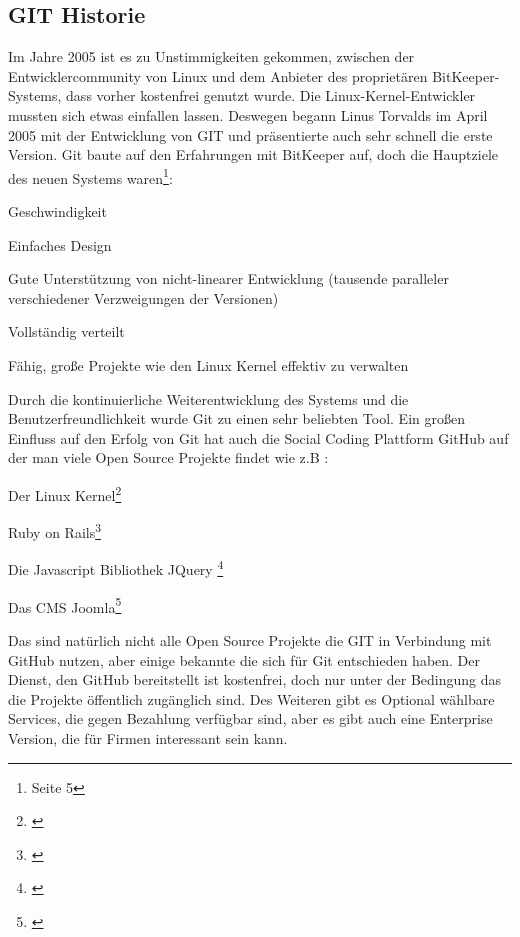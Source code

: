 \documentclass[12pt,a4paper,bibliography=totocnumbered,listof=totocnumbered]{scrartcl}
\begin{document}

\subsection{GIT Historie }
Im Jahre 2005 ist es zu Unstimmigkeiten gekommen, zwischen der Entwicklercommunity von Linux und dem Anbieter des proprietären BitKeeper-Systems, dass vorher kostenfrei genutzt wurde. Die Linux-Kernel-Entwickler mussten sich etwas einfallen lassen. Deswegen begann  Linus Torvalds im April 2005 mit der Entwicklung von GIT und präsentierte auch sehr schnell die erste Version. Git baute auf den Erfahrungen mit BitKeeper auf, doch die Hauptziele des neuen Systems waren\footnote{\cite{chacon2009pro} Seite 5}:

\begin{compactitem}
	\item Geschwindigkeit
	\item Einfaches Design
	\item Gute Unterstützung von nicht-linearer Entwicklung (tausende paralleler verschiedener Verzweigungen der Versionen)
	\item Vollständig verteilt
	\item Fähig, große Projekte wie den Linux Kernel effektiv zu verwalten
\end{compactitem}
Durch die kontinuierliche Weiterentwicklung des Systems und die Benutzerfreundlichkeit wurde Git zu einen sehr beliebten Tool.
Ein großen Einfluss auf den Erfolg von Git hat auch die Social Coding Plattform GitHub auf der man viele Open Source Projekte findet wie z.B :

\begin{compactitem}
	\item Der Linux Kernel\footnote{\cite{linux}}
	\item Ruby on Rails\footnote{\cite{ruby}}
	\item Die Javascript Bibliothek JQuery \footnote{\cite{jquery}}
	\item Das CMS Joomla\footnote{\cite{joomla}}
\end{compactitem}

Das sind natürlich nicht alle Open Source Projekte die GIT in Verbindung mit GitHub nutzen, aber einige bekannte die sich für Git entschieden haben. Der Dienst, den GitHub bereitstellt ist kostenfrei, doch nur unter der Bedingung das die Projekte öffentlich zugänglich sind. Des Weiteren gibt es Optional wählbare Services, die gegen Bezahlung verfügbar sind, aber es gibt auch eine Enterprise Version, die für Firmen interessant sein kann.    
\pagebreak
\end{document}
